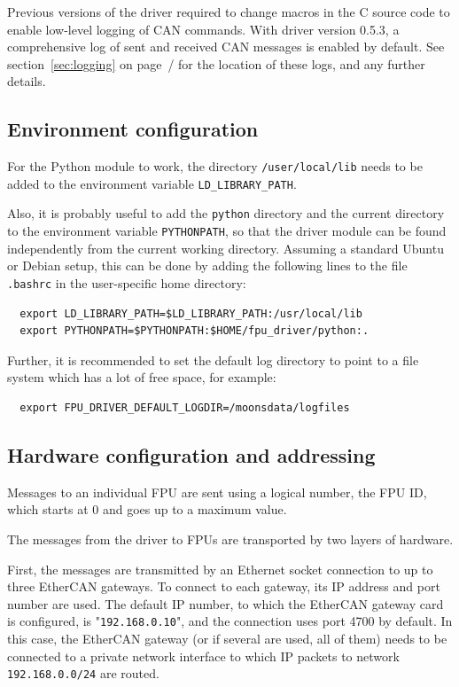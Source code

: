 \documentclass[11pt,a4paper]{report}
\begin{document}
Previous versions of the driver required to change macros in the C
source code to enable low-level logging of CAN commands.  With driver
version 0.5.3, a comprehensive log of sent and received CAN messages
is enabled by default. See section~\ref{sec:logging} on
page~/\pageref{sec:logging} for the location of these logs, and any
further details.


\subsection{Environment configuration}
For the Python module to work, the directory \texttt{/user/local/lib}
needs to be added to the environment variable
\texttt{LD\_LIBRARY\_PATH}.

Also, it is probably useful to add the \texttt{python} directory and
the current directory to the environment variable \texttt{PYTHONPATH},
so that the driver module can be found independently from the current
working directory.  Assuming a standard Ubuntu or Debian setup, this
can be done by adding the following lines to the file \texttt{.bashrc}
in the user-specific home directory:

\begin{verbatim}
  export LD_LIBRARY_PATH=$LD_LIBRARY_PATH:/usr/local/lib
  export PYTHONPATH=$PYTHONPATH:$HOME/fpu_driver/python:.
\end{verbatim}

Further, it is recommended to set the default log directory to point
to a file system which has a lot of free space, for example:
\begin{verbatim}
  export FPU_DRIVER_DEFAULT_LOGDIR=/moonsdata/logfiles
\end{verbatim}


\subsection{Hardware configuration and addressing}
Messages to an individual FPU are sent using a logical number, the FPU
ID, which starts at 0 and goes up to a maximum value.

The messages from the driver to FPUs are transported by two layers of
hardware.

   First, the
messages are transmitted by an Ethernet socket connection to up to
three EtherCAN gateways. To connect to each gateway, its IP address
and port number are used. The default IP number, to which the EtherCAN
gateway card is configured, is "\texttt{192.168.0.10}", and the
connection uses port 4700 by default. In this case, the EtherCAN
gateway (or if several are used, all of them) needs to be connected to
a private network interface to which IP packets to network
\texttt{192.168.0.0/24} are routed.
\end{document}
